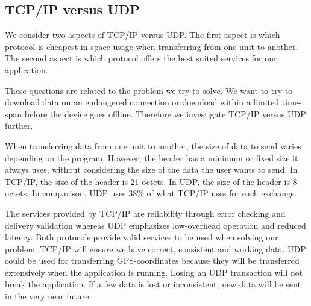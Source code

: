 
\subsection{TCP/IP versus UDP}
We consider two aspects of TCP/IP versus UDP. The first aspect is which protocol is cheapest in space usage when transferring from one unit to another. The second aspect is which protocol offers the best suited services for our application.

These questions are related to the problem we try to solve. We want to try to download data on an endangered connection or download within a limited time-span before the device goes offline. Therefore we investigate TCP/IP versus UDP further.

When transferring data from one unit to another, the size of data to send varies depending on the program. However, the header has a minimum or fixed size it always uses, without considering the size of the data the user wants to send. In TCP/IP, the size of the header is 21 octets\cite{tcpdesc}. In UDP, the size of the header is 8 octets\cite{udpdesc}. In comparison, UDP uses 38\% of what TCP/IP uses for each exchange.

The services provided by TCP/IP are reliability through error checking and delivery validation whereas UDP emphasizes low-overhead operation and reduced latency\cite{wiki-tcp}. Both protocols provide valid services to be used when solving our problem. TCP/IP will ensure we have correct, consistent and working data. UDP could be used for transferring GPS-coordinates because they will be transferred extensively when the application is running. Losing an UDP transaction will not break the application. If a few data is lost or inconsistent, new data will be sent in the very near future.